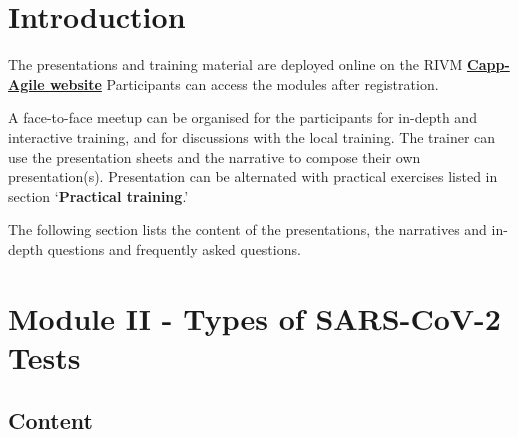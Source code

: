\documentclass[
]{book}
\begin{document}
\hypertarget{introduction}{%
\section{Introduction}\label{introduction}}

The presentations and training material are deployed online on the RIVM
\textbf{\href{https://rivm-training-hub.cappagile.com/login}{Capp-Agile website}}
Participants can access the modules after registration.

A face-to-face meetup can be organised for the participants for in-depth
and interactive training, and for discussions with the local training.
The trainer can use the presentation sheets and the narrative to compose
their own presentation(s). Presentation can be alternated with practical
exercises listed in section `\textbf{Practical training}.'

The following section lists the content of the presentations, the
narratives and in-depth questions and frequently asked questions.

\hypertarget{M2}{%
\section{Module II - Types of SARS-CoV-2 Tests}\label{M2}}

\hypertarget{content}{%
\subsection{Content}\label{content}}
\end{document}
